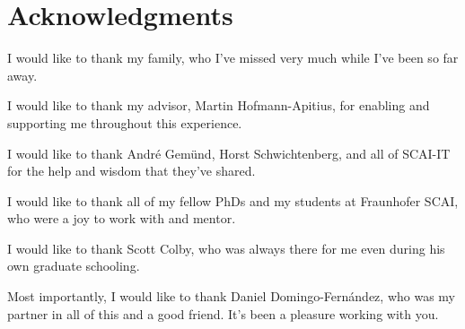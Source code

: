 \chapter*{Acknowledgments}

I would like to thank my family, who I've missed very much while I've been so far away.

I would like to thank my advisor, Martin Hofmann-Apitius, for enabling and supporting me throughout this experience.

I would like to thank André Gemünd, Horst Schwichtenberg, and all of SCAI-IT for the help and wisdom that they've shared.

I would like to thank all of my fellow PhDs and my students at Fraunhofer SCAI, who were a joy to work with and mentor.

I would like to thank Scott Colby, who was always there for me even during his own graduate schooling.

Most importantly, I would like to thank Daniel Domingo-Fern\'{a}ndez, who was my partner in all of this and a good friend.
It's been a pleasure working with you.
